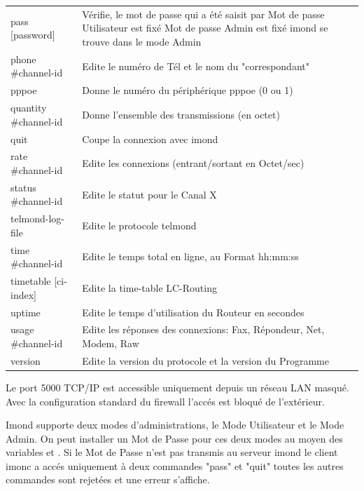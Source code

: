 \begin{table}
\begin{tabular}{lp{9cm}}
      pass [password]           & Vérifie, le mot de passe qui a été saisit par\newline
                                  1 Mot de passe Utilisateur est fixé\newline
                                  2 Mot de passe Admin est fixé\newline
                                  4 imond se trouve dans le mode Admin \\
      phone \#channel-id        & Edite le numéro de Tél et le nom du "correspondant" \\
      pppoe                     & Donne le numéro du périphérique pppoe (0 ou 1) \\
      quantity \#channel-id     & Donne l'ensemble des transmissions (en octet) \\
      quit                      & Coupe la connexion avec imond \\
      rate \#channel-id         & Edite les connexions (entrant/sortant en Octet/sec) \\
      status \#channel-id       & Edite le statut pour le Canal X \\
      telmond-log-file          & Edite le protocole telmond \\
      time \#channel-id         & Edite le temps total en ligne, au Format hh:mm:ss \\
      timetable [ci-index]      & Edite la time-table LC-Routing \\
      uptime                    & Edite le temps d'utilisation du Routeur en secondes \\
      usage \#channel-id        & Edite les réponses des connexions: Fax, Répondeur, Net, Modem, Raw \\
      version                   & Edite la version du protocole et la version du Programme \\
    \end{tabular}
  \end{table}


  Le port 5000 TCP/IP est accessible uniquement depuis un réseau LAN
  masqué. Avec la configuration standard du firewall l'accés est bloqué
  de l'extérieur.

  Imond supporte deux modes d'administrations, le Mode Utilisateur et
  le Mode Admin. On peut installer un Mot de Passe pour ces deux modes
  au moyen des variables  et .
  Si le Mot de Passe n'est pas transmis au serveur imond le client imonc
  a accés uniquement à deux commandes "pass" et "quit" toutes les autres
  commandes sont rejetées et une erreur s'affiche.

